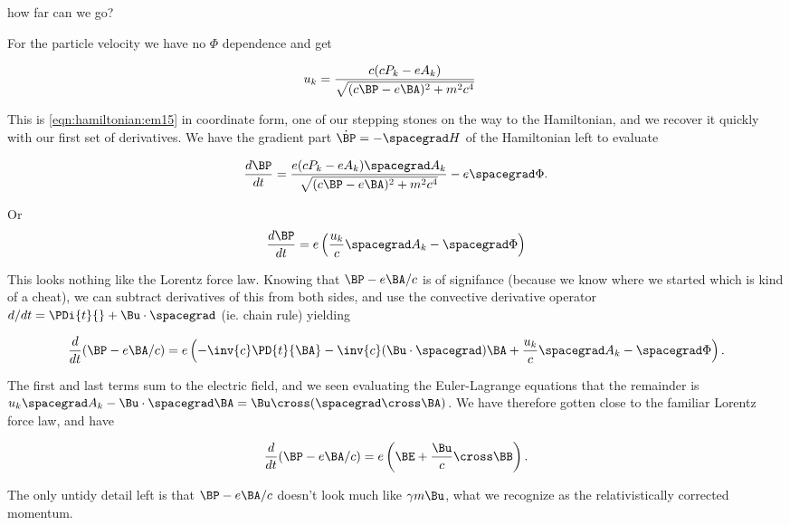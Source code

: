 how far can we go?

For the particle velocity we have no $\Phi$ dependence and get

\begin{align}\label{eqn:hamiltonian:em22}
u_k &= \frac{c (c P_k -e A_k)}{\sqrt{ (c \BP - e \BA)^2 + m^2 c^4 }}
\end{align}

This is \ref{eqn:hamiltonian:em15} in coordinate form, one of our stepping stones on the way to the Hamiltonian, and we recover it quickly with our first set of derivatives.  We have the gradient part $\dot{\BP} = -\spacegrad H$ of the Hamiltonian left to evaluate 

\begin{align}\label{eqn:hamiltonian:em23}
\frac{d\BP}{dt} = 
\frac{e (c P_k -e A_k) \spacegrad A_k }{\sqrt{ (c \BP - e \BA)^2 + m^2 c^4 }} - e \spacegrad \Phi.
\end{align}

Or
\begin{align}\label{eqn:hamiltonian:em23b}
\frac{d\BP}{dt} = e \left( \frac{u_k}{c} \spacegrad A_k - \spacegrad \Phi \right)
\end{align}

This looks nothing like the Lorentz force law.  Knowing that $\BP - e\BA/c$ is of signifance (because we know where we started which is kind of a cheat), we can subtract derivatives of this from both sides, and use the convective derivative operator $d/dt = \PDi{t}{} + \Bu \cdot \spacegrad$ (ie. chain rule) yielding

\begin{align}\label{eqn:hamiltonian:em23c}
\frac{d}{dt}(\BP - e\BA/c) = e \left( -\inv{c}\PD{t}{\BA} - \inv{c} (\Bu \cdot \spacegrad) \BA + \frac{u_k}{c} \spacegrad A_k - \spacegrad \Phi \right).
\end{align}

The first and last terms sum to the electric field, and we seen evaluating the Euler-Lagrange equations that the remainder is $u_k \spacegrad A_k - \Bu \cdot \spacegrad \BA = \Bu \cross (\spacegrad \cross \BA)$.  We have therefore gotten close to the familiar Lorentz force law, and have

\begin{align}\label{eqn:hamiltonian:em24}
\frac{d}{dt}(\BP - e\BA/c) = e \left( \BE + \frac{\Bu}{c} \cross \BB \right).
\end{align}

The only untidy detail left is that $\BP - e \BA/c$ doesn't look much like $\gamma m \Bu$, what we recognize as the relativistically corrected momentum.

\EndArticle
